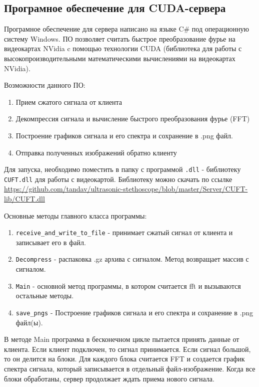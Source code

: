 \documentclass[../paper.tex]{subfiles}
\begin{document}
\subsection{Програмное обеспечение для CUDA-сервера}
Програмное обеспечение для сервера написано на языке C\# под операционную систему Windows. ПО позволяет считать быстрое преобразование фурье на видеокартах NVidia c помощью технологии CUDA (библиотека для работы с высокопроизводительными математическими вычислениями на видеокартах NVidia).

Возможности данного ПО:
\begin{enumerate}
  \item Прием сжатого сигнала от клиента
  \item Декомпрессия сигнала и вычисление быстрого преобразования фурье (FFT)
  \item Построение графиков сигнала и его спектра и сохранение в .png файл.
  \item Отправка полученных изображений обратно клиенту
\end{enumerate}

Для запуска, необходимо поместить в папку с программой \verb|.dll| - библиотеку \verb|CUFT.dll| для работы с видеокартой. Библиотеку можно скачать по ссылке \url{https://github.com/tandav/ultrasonic-stethoscope/blob/master/Server/CUFT-lib/CUFT.dll}

Основные методы главного класса программы:
\begin{enumerate}
  \item \verb|receive_and_write_to_file| - принимает сжатый сигнал от клиента и записывает его в файл.
  \item \verb|Decompress| - распаковка .gz архива с сигналом. Метод возвращает массив с сигналом.
  \item \verb|Main| - основной метод программы, в котором считается fft и вызываются остальные методы.
  \item \verb|save_pngs| - Построение графиков сигнала и его спектра и сохранение в .png файл(ы).
\end{enumerate}

В методе Main программа в бесконечном цикле пытается принять данные от клиента. Если клиент подключен, то сигнал принимается. Если сигнал большой, то он делится на блоки. Для каждого блока считается FFT и создается график спектра сигнала, который записывается в отдельный файл-изображение. Когда все блоки обработаны, сервер продолжает ждать приема нового сигнала.
\end{document}

